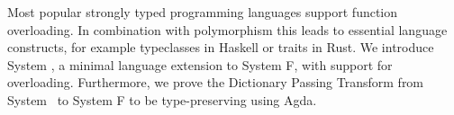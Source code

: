 Most popular strongly typed programming languages support function overloading. 
In combination with polymorphism this leads to essential language constructs, for example typeclasses in Haskell or traits in Rust.  
We introduce System \Fo, a minimal language extension to System F, with support for overloading.
Furthermore, we prove the Dictionary Passing Transform from System \Fo\ to System F to be type-preserving using Agda.
